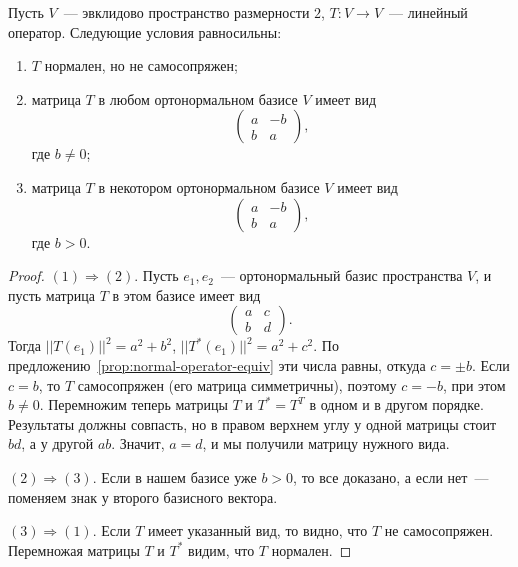 \begin{proposition}\label{prop:real-normal-not-self-adjoint-dim-2}
Пусть $V$~--- эвклидово пространство размерности $2$,
$T\colon V\to V$~--- линейный оператор.
Следующие условия равносильны:
\begin{enumerate}
\item $T$ нормален, но не самосопряжен;
\item матрица $T$ в любом ортонормальном базисе $V$ имеет вид
$$
\begin{pmatrix} a & -b \\ b & a\end{pmatrix},
$$
где $b\neq 0$;
\item матрица $T$ в некотором ортонормальном базисе $V$ имеет вид
$$
\begin{pmatrix} a & -b \\ b & a\end{pmatrix},
$$
где $b > 0$.
\end{enumerate}
\end{proposition}
\begin{proof}
$(1)\Rightarrow (2)$. Пусть $e_1,e_2$~--- ортонормальный базис
пространства $V$, и пусть матрица $T$ в этом базисе имеет вид
$$
\begin{pmatrix}a & c\\b & d\end{pmatrix}.
$$
Тогда $||T(e_1)||^2 = a^2 + b^2$, $||T^*(e_1)||^2 = a^2 + c^2$.
По предложению~\ref{prop:normal-operator-equiv} эти числа равны,
откуда $c = \pm b$. Если $c=b$, то $T$ самосопряжен (его матрица
симметричны), поэтому $c = -b$, при этом $b\neq 0$.
Перемножим теперь матрицы
$T$ и $T^*= T^T$ в одном и в другом порядке. Результаты должны
совпасть, но в правом верхнем углу у одной матрицы стоит $bd$, а у
другой $ab$. Значит, $a=d$, и мы получили матрицу нужного вида.

$(2)\Rightarrow (3)$. Если в нашем базисе уже $b>0$, то все доказано,
а если нет~--- поменяем знак у второго базисного вектора.

$(3)\Rightarrow (1)$. Если $T$ имеет указанный вид, то видно, что $T$
не самосопряжен. Перемножая матрицы $T$ и $T^*$ видим, что $T$
нормален.
\end{proof}


